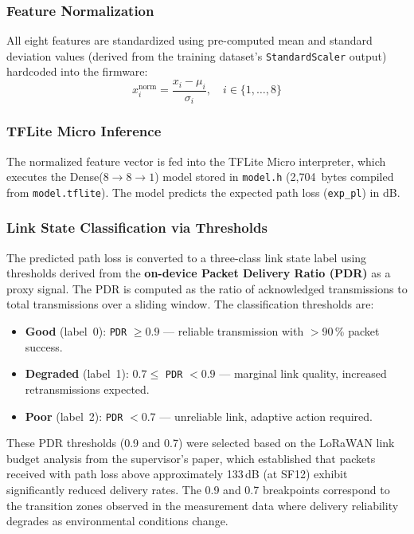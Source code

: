 \documentclass[12pt, a4paper, twoside, openright]{report}
\begin{document}
\subsubsection{Feature Normalization}
All eight features are standardized using pre-computed mean and standard deviation values (derived from the training dataset's \texttt{StandardScaler} output) hardcoded into the firmware:
\[
  x_i^{\text{norm}} = \frac{x_i - \mu_i}{\sigma_i}, \quad i \in \{1, \ldots, 8\}
\]

\subsubsection{TFLite Micro Inference}
The normalized feature vector is fed into the TFLite Micro interpreter, which executes the Dense($8{\to}8{\to}1$) model stored in \texttt{model.h} (2,704~bytes compiled from \texttt{model.tflite}). The model predicts the expected path loss (\texttt{exp\_pl}) in dB.

\subsubsection{Link State Classification via Thresholds}
\label{sec:thresholds}
The predicted path loss is converted to a three-class link state label using thresholds derived from the \textbf{on-device Packet Delivery Ratio (PDR)} as a proxy signal. The PDR is computed as the ratio of acknowledged transmissions to total transmissions over a sliding window. The classification thresholds are:
\begin{itemize}
  \item \textbf{Good} (label~0): \texttt{PDR} $\geq 0.9$ --- reliable transmission with $>$90\,\% packet success.
  \item \textbf{Degraded} (label~1): $0.7 \leq$ \texttt{PDR} $< 0.9$ --- marginal link quality, increased retransmissions expected.
  \item \textbf{Poor} (label~2): \texttt{PDR} $< 0.7$ --- unreliable link, adaptive action required.
\end{itemize}

\noindent
These PDR thresholds (0.9 and 0.7) were selected based on the LoRaWAN link budget analysis from the supervisor's paper, which established that packets received with path loss above approximately 133\,dB (at SF12) exhibit significantly reduced delivery rates. The 0.9 and 0.7 breakpoints correspond to the transition zones observed in the measurement data where delivery reliability degrades as environmental conditions change.
\end{document}
